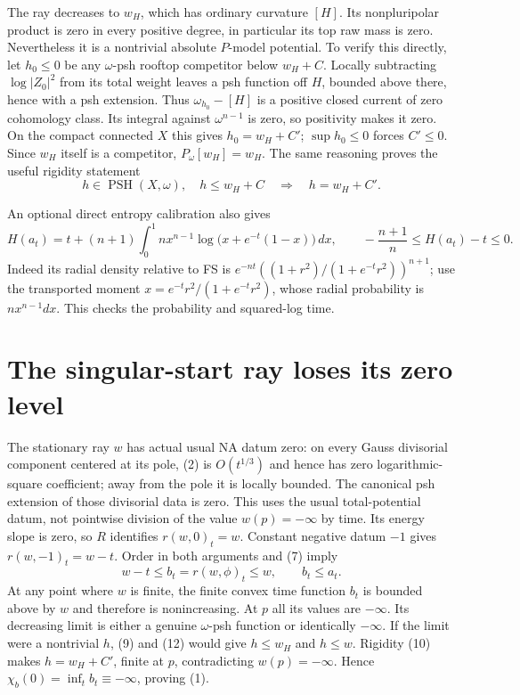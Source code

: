 \documentclass[10pt]{article}
\begin{document}
The ray decreases to $w_H$, which has ordinary curvature $[H]$.
Its nonpluripolar product is zero in every positive degree, in
particular its top raw mass is zero. Nevertheless it is a nontrivial
absolute $P$-model potential. To verify this directly, let
$h_0\leq0$ be any $\omega$-psh rooftop competitor below $w_H+C$.
Locally subtracting $\log|Z_0|^2$ from its total weight leaves a
psh function off $H$, bounded above there, hence with a psh extension.
Thus $\omega_{h_0}-[H]$ is a positive closed current of zero
cohomology class. Its integral against $\omega^{n-1}$ is zero,
so positivity makes it zero. On the compact connected $X$ this gives
$h_0=w_H+C'$; $\sup h_0\leq0$ forces $C'\leq0$.
Since $w_H$ itself is a competitor, $P_\omega[w_H]=w_H$.
The same reasoning proves the useful rigidity statement
\[
 h\in\operatorname{PSH}(X,\omega),\quad h\leq w_H+C
                      \quad\Longrightarrow\quad h=w_H+C'.       \tag{10}
\]

An optional direct entropy calibration also gives
\[
 H(a_t)=t+(n+1)\int_0^1n x^{n-1}
                     \log\bigl(x+e^{-t}(1-x)\bigr)\,dx,
 \qquad -\frac{n+1}{n}\leq H(a_t)-t\leq0.              \tag{11}
\]
Indeed its radial density relative to FS is
$e^{-nt}((1+r^2)/(1+e^{-t}r^2))^{n+1}$; use the transported
moment $x=e^{-t}r^2/(1+e^{-t}r^2)$, whose radial probability is
$n x^{n-1}dx$. This checks the probability and squared-log time.

\section{The singular-start ray loses its zero level}
The stationary ray $w$ has actual usual NA datum zero: on every
Gauss divisorial component centered at its pole, (2) is $O(t^{1/3})$
and hence has zero logarithmic-square coefficient; away from the
pole it is locally bounded. The canonical psh extension of those
divisorial data is zero. This uses the usual total-potential datum,
not pointwise division of the value $w(p)=-\infty$ by time.
Its energy slope is zero, so $R$ identifies $r(w,0)_t=w$.
Constant negative datum $-1$ gives $r(w,-1)_t=w-t$.
Order in both arguments and (7) imply
\[
                w-t\leq b_t=r(w,\phi)_t\leq w,
                \qquad b_t\leq a_t.                   \tag{12}
\]
At any point where $w$ is finite, the finite convex time function
$b_t$ is bounded above by $w$ and therefore is nonincreasing.
At $p$ all its values are $-\infty$. Its decreasing limit is
either a genuine $\omega$-psh function or identically $-\infty$.
If the limit were a nontrivial $h$, (9) and (12) would give
$h\leq w_H$ and $h\leq w$. Rigidity (10) makes
$h=w_H+C'$, finite at $p$, contradicting $w(p)=-\infty$.
Hence $\chi_b(0)=\inf_t b_t\equiv-\infty$, proving (1).
\end{document}
